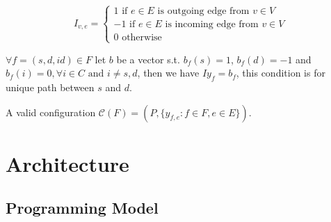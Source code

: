 \documentclass[conference, twocolumn]{IEEEtran}
\theoremstyle{definition}
\begin{document}


\begin{equation}
I_{v,e} = \left\{ \begin{array}{lrc}
1 \mbox{ if } e \in E \mbox{ is outgoing edge from } v \in V \\
-1 \mbox{ if } e \in E \mbox{ is incoming edge from } v \in V \\
0 \mbox{ otherwise}
\end{array}\right. 
\end{equation}

$\forall f=(s, d, id) \in F$  let $b$ be a vector s.t. $b_f(s) = 1$, 
$b_f(d) = -1$ and $b_f(i) = 0, \forall i \in C \mbox{ and } i \neq s, d$,
 then we have $Iy_f=b_f$, this condition is for unique path between $s$ and $d$.

A valid configuration ${\mathcal{C}}(F)=(P, \lbrace y_{f,e}:f \in F, e \in E
\rbrace )$.

\section{Architecture}
\subsection{Programming Model}
\end{document}
